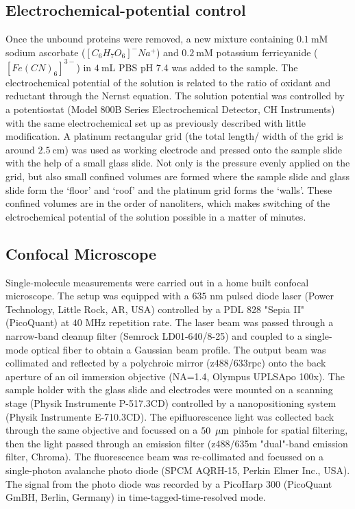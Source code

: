 \subsection{Electrochemical-potential control}
Once the unbound proteins were removed, a new mixture containing $0.1~$mM sodium ascorbate ($[C_6H_7O_6]^-Na^+$) and $0.2~$mM potassium ferricyanide ($[Fe(CN)_6]^{3-}$) in $4~$mL PBS pH 7.4 was added to the sample. The electrochemical potential of the solution is related to the ratio of oxidant and reductant through the Nernst equation. The solution potential was controlled by a potentiostat (Model 800B Series Electrochemical Detector, CH Instruments) with the same electrochemical set up as previously described\cite{zhang2017gold} with little modification. A platinum rectangular grid (the total length/ width of the grid is around $2.5~$cm) was used as working electrode and pressed onto the sample slide with the help of a small glass slide. Not only is the pressure evenly applied on the grid, but also small confined volumes are formed where the sample slide and glass slide form the `floor' and `roof' and the platinum grid forms the `walls'. These confined volumes are in the order of nanoliters, which makes switching of the elctrochemical potential of the solution possible in a matter of minutes.
\subsection{Confocal Microscope}
Single-molecule measurements were carried out in a home built confocal microscope. The setup was equipped with a $635$ nm pulsed diode laser (Power Technology, Little Rock, AR, USA) controlled by a PDL 828 "Sepia II" (PicoQuant) at $40$ MHz repetition rate. The laser beam was passed through a narrow-band cleanup filter (Semrock LD01-640/8-25) and coupled to a single-mode optical fiber to obtain a Gaussian beam profile. The output beam was collimated and reflected by a polychroic mirror (z488/633rpc) onto the back aperture of an oil immersion objective (NA=1.4, Olympus UPLSApo 100x). The sample holder with the glass slide and electrodes were mounted on a scanning stage (Physik Instrumente P-517.3CD) controlled by a nanopositioning system (Physik Instrumente E-710.3CD). The epifluorescence light was collected back through the same objective and focussed on a $50~\,\mu\textrm{m}$ pinhole for spatial filtering, then the light passed through an emission filter (z488/635m "dual"-band emission filter, Chroma). The fluorescence beam was re-collimated and focussed on a single-photon avalanche photo diode (SPCM AQRH-15, Perkin Elmer Inc., USA). The signal from the photo diode was recorded by a PicoHarp 300 (PicoQuant GmBH, Berlin, Germany) in time-tagged-time-resolved mode.
